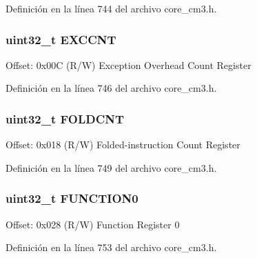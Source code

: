 Definición en la línea 744 del archivo core\+\_\+cm3.\+h.

\subsubsection[{\texorpdfstring{E\+X\+C\+C\+NT}{EXCCNT}}]{ uint32\+\_\+t E\+X\+C\+C\+NT}\hypertarget{struct_d_w_t___type_ae6edad4ef9f92b3ce206dac61621871a}{}\label{struct_d_w_t___type_ae6edad4ef9f92b3ce206dac61621871a}
Offset\+: 0x00C (R/W) Exception Overhead Count Register 

Definición en la línea 746 del archivo core\+\_\+cm3.\+h.

\subsubsection[{\texorpdfstring{F\+O\+L\+D\+C\+NT}{FOLDCNT}}]{ uint32\+\_\+t F\+O\+L\+D\+C\+NT}\hypertarget{struct_d_w_t___type_a11e6aebbf2c7bedc29059ff023891b82}{}\label{struct_d_w_t___type_a11e6aebbf2c7bedc29059ff023891b82}
Offset\+: 0x018 (R/W) Folded-\/instruction Count Register 

Definición en la línea 749 del archivo core\+\_\+cm3.\+h.

\subsubsection[{\texorpdfstring{F\+U\+N\+C\+T\+I\+O\+N0}{FUNCTION0}}]{ uint32\+\_\+t F\+U\+N\+C\+T\+I\+O\+N0}\hypertarget{struct_d_w_t___type_a7eb6189fbcdf2ad9d0d28dad691f3fe8}{}\label{struct_d_w_t___type_a7eb6189fbcdf2ad9d0d28dad691f3fe8}
Offset\+: 0x028 (R/W) Function Register 0 

Definición en la línea 753 del archivo core\+\_\+cm3.\+h.

